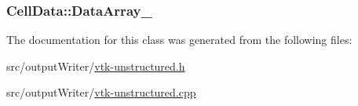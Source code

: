 \subsubsection[{\texorpdfstring{Data\+Array\+\_\+}{DataArray_}}]{ Cell\+Data\+::\+Data\+Array\+\_\+\hspace{0.3cm}{\ttfamily [protected]}}\hypertarget{classCellData_a6dc3acb849afce77fd961dbcabaa9252}{}\label{classCellData_a6dc3acb849afce77fd961dbcabaa9252}


The documentation for this class was generated from the following files\+:\begin{DoxyCompactItemize}
\item 
src/output\+Writer/\hyperlink{vtk-unstructured_8h}{vtk-\/unstructured.\+h}\item 
src/output\+Writer/\hyperlink{vtk-unstructured_8cpp}{vtk-\/unstructured.\+cpp}\end{DoxyCompactItemize}
